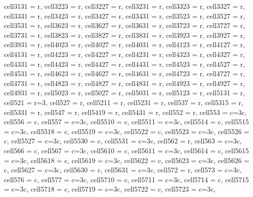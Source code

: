 \begin{table*}[ht!]
{\begin{tblr}
{  cell{31}{31} = {r},
  cell{32}{23} = {r},
  cell{32}{27} = {r},
  cell{32}{31} = {r},
  cell{33}{23} = {r},
  cell{33}{27} = {r},
  cell{33}{31} = {r},
  cell{34}{23} = {r},
  cell{34}{27} = {r},
  cell{34}{31} = {r},
  cell{35}{23} = {r},
  cell{35}{27} = {r},
  cell{35}{31} = {r},
  cell{36}{23} = {r},
  cell{36}{27} = {r},
  cell{36}{31} = {r},
  cell{37}{23} = {r},
  cell{37}{27} = {r},
  cell{37}{31} = {r},
  cell{38}{23} = {r},
  cell{38}{27} = {r},
  cell{38}{31} = {r},
  cell{39}{23} = {r},
  cell{39}{27} = {r},
  cell{39}{31} = {r},
  cell{40}{23} = {r},
  cell{40}{27} = {r},
  cell{40}{31} = {r},
  cell{41}{23} = {r},
  cell{41}{27} = {r},
  cell{41}{31} = {r},
  cell{42}{23} = {r},
  cell{42}{27} = {r},
  cell{42}{31} = {r},
  cell{43}{23} = {r},
  cell{43}{27} = {r},
  cell{43}{31} = {r},
  cell{44}{23} = {r},
  cell{44}{27} = {r},
  cell{44}{31} = {r},
  cell{45}{23} = {r},
  cell{45}{27} = {r},
  cell{45}{31} = {r},
  cell{46}{23} = {r},
  cell{46}{27} = {r},
  cell{46}{31} = {r},
  cell{47}{23} = {r},
  cell{47}{27} = {r},
  cell{47}{31} = {r},
  cell{48}{23} = {r},
  cell{48}{27} = {r},
  cell{48}{31} = {r},
  cell{49}{23} = {r},
  cell{49}{27} = {r},
  cell{49}{31} = {r},
  cell{50}{23} = {r},
  cell{50}{27} = {r},
  cell{50}{31} = {r},
  cell{51}{23} = {r},
  cell{51}{31} = {r},
  cell{52}{1} = {r=3}{},
  cell{52}{7} = {r},
  cell{52}{11} = {r},
  cell{52}{31} = {r},
  cell{53}{7} = {r},
  cell{53}{15} = {r},
  cell{53}{31} = {r},
  cell{54}{7} = {r},
  cell{54}{19} = {r},
  cell{54}{31} = {r},
  cell{55}{2} = {r},
  cell{55}{3} = {c=3}{c},
  cell{55}{6} = {c},
  cell{55}{7} = {c=3}{c},
  cell{55}{10} = {c},
  cell{55}{11} = {c=3}{c},
  cell{55}{14} = {c},
  cell{55}{15} = {c=3}{c},
  cell{55}{18} = {c},
  cell{55}{19} = {c=3}{c},
  cell{55}{22} = {c},
  cell{55}{23} = {c=3}{c},
  cell{55}{26} = {c},
  cell{55}{27} = {c=3}{c},
  cell{55}{30} = {c},
  cell{55}{31} = {c=3}{c},
  cell{56}{2} = {r},
  cell{56}{3} = {c=3}{c},
  cell{56}{6} = {c},
  cell{56}{7} = {c=3}{c},
  cell{56}{10} = {c},
  cell{56}{11} = {c=3}{c},
  cell{56}{14} = {c},
  cell{56}{15} = {c=3}{c},
  cell{56}{18} = {c},
  cell{56}{19} = {c=3}{c},
  cell{56}{22} = {c},
  cell{56}{23} = {c=3}{c},
  cell{56}{26} = {c},
  cell{56}{27} = {c=3}{c},
  cell{56}{30} = {c},
  cell{56}{31} = {c=3}{c},
  cell{57}{2} = {r},
  cell{57}{3} = {c=3}{c},
  cell{57}{6} = {c},
  cell{57}{7} = {c=3}{c},
  cell{57}{10} = {c},
  cell{57}{11} = {c=3}{c},
  cell{57}{14} = {c},
  cell{57}{15} = {c=3}{c},
  cell{57}{18} = {c},
  cell{57}{19} = {c=3}{c},
  cell{57}{22} = {c},
  cell{57}{23} = {c=3}{c},
}
\end{tblr}}
\end{table*}
